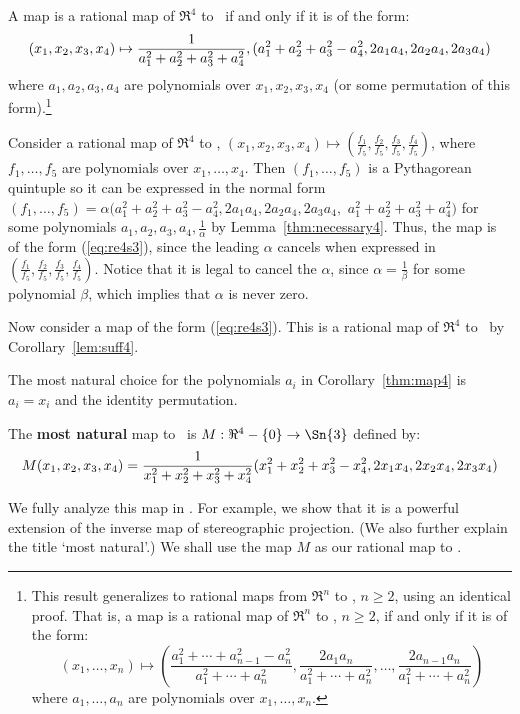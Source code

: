 \documentclass[11pt]{article}
\begin{document}
\begin{corollary}
\label{thm:map4}
A map is a rational map of $\Re^4$ to \ if and only if
it is of the form:
\begin{equation}
\label{eq:re4s3}
\small{(x_1,x_2,x_3,x_4)} \mapsto 
\small{\frac{1}{a_1^2 + a_2^2 + a_3^2 + a_4^2},
	(a_1^2 + a_2^2 + a_3^2 - a_4^2, 2a_1a_4, 2a_2a_4, 2a_3a_4)}
\end{equation}
where $a_1,a_2,a_3,a_4$ are polynomials over $x_1,x_2,x_3,x_4$
(or some permutation of this form).\footnote{This result generalizes
	to rational maps from $\Re^n$ to , $n \geq 2$,
	using an identical proof.
	That is, a map is a rational map of $\Re^n$ to , $n \geq 2$, 
	if and only if it is of the form:
\[
	(x_1,\ldots,x_n) \mapsto
	(\frac{a_1^2 + \cdots + a_{n-1}^2 - a_n^2}{a_1^2 + \cdots + a_n^2},
	 \frac{2a_1a_n}{a_1^2 + \cdots + a_n^2},
	 \ldots,
	 \frac{2a_{n-1}a_n}{a_1^2 + \cdots + a_n^2})
\]
where $a_1,\ldots,a_n$ are polynomials over $x_1,\ldots,x_n$.}
\end{corollary}
\prf
Consider a rational map
of $\Re^4$ to , $(x_1,x_2,x_3,x_4) \mapsto 
(\frac{f_1}{f_5},\frac{f_2}{f_5},\frac{f_3}{f_5},\frac{f_4}{f_5})$,
where $f_1,\ldots,f_5$ are polynomials over $x_1,\ldots,x_4$.
Then $(f_1,\ldots,f_5)$ is a Pythagorean quintuple
so it can be expressed in the normal form
$(f_1,\ldots,f_5) = \alpha (a_1^2 + a_2^2 + a_3^2 - a_4^2,
2a_1a_4,2a_2a_4,2a_3a_4,$ $a_1^2 + a_2^2 + a_3^2 + a_4^2)$
for some polynomials $a_1,a_2,a_3,a_4,\frac{1}{\alpha}$
by Lemma~\ref{thm:necessary4}.
Thus, the map is of the form (\ref{eq:re4s3}), since the leading $\alpha$
cancels when expressed in 
$(\frac{f_1}{f_5},\frac{f_2}{f_5},\frac{f_3}{f_5},\frac{f_4}{f_5})$.
Notice that it is legal to cancel the $\alpha$, since
$\alpha = \frac{1}{\beta}$ for some polynomial $\beta$,
which implies that $\alpha$ is never zero.

Now consider a map of the form (\ref{eq:re4s3}).
This is a rational map of $\Re^4$ to \ by Corollary~\ref{lem:suff4}.
\QED

\noindent The most natural choice for the polynomials $a_i$ 
in Corollary~\ref{thm:map4} is $a_i = x_i$ and the identity permutation.
%
\begin{defn2}
The {\bf most natural} map to \ is 
$M: \Re^4 - \{0\} \rightarrow \Sn{3}$ defined by:
\begin{equation}
\label{eqM}
\footnotesize{
	M(x_1,x_2,x_3,x_4) =
	\frac{1}{x_1^2 + x_2^2 + x_3^2 + x_4^2}
	(x_1^2 + x_2^2 + x_3^2 - x_4^2, 2x_1x_4, 2x_2x_4, 2x_3x_4)
	 }
\end{equation}
\end{defn2}
%
We fully analyze this map in \cite{jj98b}.
For example, we show that it is a powerful extension of
the inverse map of stereographic projection.
(We also further explain the title `most natural'.)
We shall use the map $M$ as our rational map to .
\end{document}
